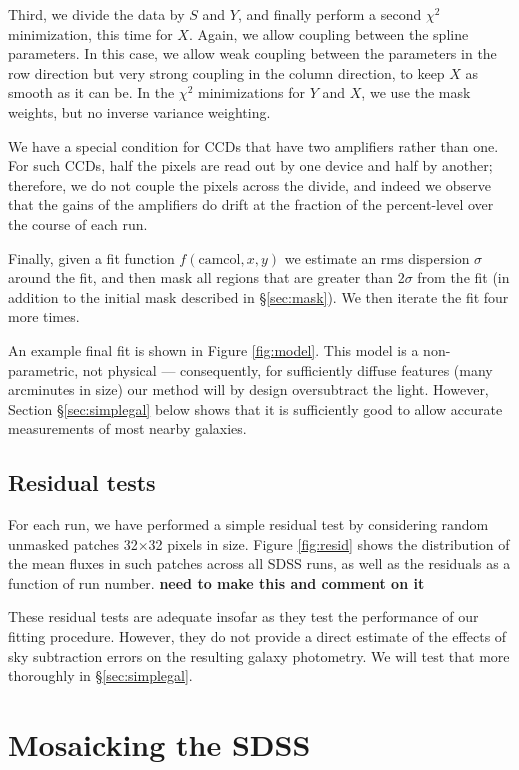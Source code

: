 \documentclass[10pt,preprint]{aastex}
\begin{document}
Third, we divide the data by $S$ and $Y$, and finally perform a second
$\chi^2$ minimization, this time for $X$. Again, we allow coupling
between the spline parameters.  In this case, we allow weak coupling
between the parameters in the row direction but very strong coupling
in the column direction, to keep $X$ as smooth as it can be. In the
$\chi^2$ minimizations for $Y$ and $X$, we use the mask weights, but
no inverse variance weighting.

We have a special condition for CCDs that have two amplifiers rather
than one. For such CCDs, half the pixels are read out by one device
and half by another; therefore, we do not couple the pixels across the
divide, and indeed we observe that the gains of the amplifiers do
drift at the fraction of the percent-level over the course of each
run.

Finally, given a fit function $f(\mathrm{camcol}, x, y)$ we estimate
an rms dispersion $\sigma$ around the fit, and then mask all regions
that are greater than 2$\sigma$ from the fit (in addition to the
initial mask described in \S\ref{sec:mask}). We then iterate the fit
four more times. 

An example final fit is shown in Figure \ref{fig:model}. This model is
a non-parametric, not physical --- consequently, for sufficiently
diffuse features (many arcminutes in size) our method will by design
oversubtract the light.  However, Section
\S\ref{sec:simplegal} below shows that it is sufficiently good to
allow accurate measurements of most nearby galaxies.

\subsection{Residual tests}
\label{sec:residuals}

For each run, we have performed a simple residual test by considering
random unmasked patches 32$\times$32 pixels in size. Figure
\ref{fig:resid} shows the distribution of the mean fluxes in such
patches across all SDSS runs, as well as the residuals as a function
of run number.  {\bf need to make this and comment on it}

These residual tests are adequate insofar as they test the performance
of our fitting procedure.  However, they do not provide a direct
estimate of the effects of sky subtraction errors on the resulting
galaxy photometry.  We will test that more thoroughly in
\S\ref{sec:simplegal}.

\section{ Mosaicking the SDSS}
\label{sec:mosaic}
\end{document}
